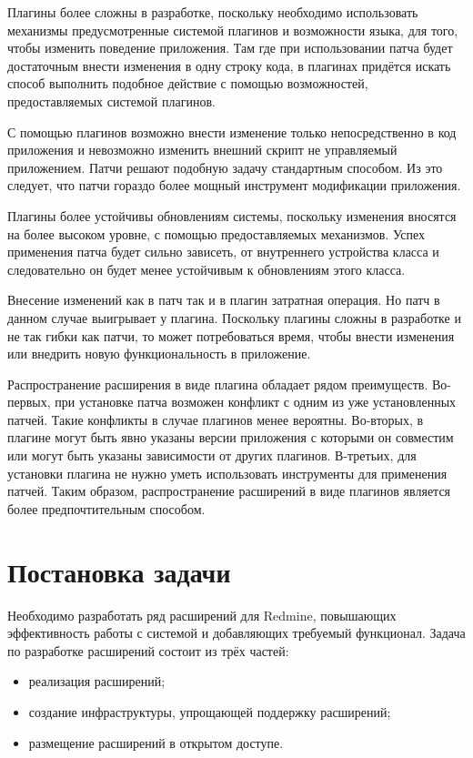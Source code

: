Плагины более сложны в разработке, поскольку необходимо использовать
механизмы предусмотренные системой плагинов и возможности языка, для того,
чтобы изменить поведение приложения. Там где при использовании патча будет
достаточным внести изменения в одну строку кода, в плагинах придётся искать
способ выполнить подобное действие с помощью возможностей, предоставляемых
системой плагинов.

С помощью плагинов возможно внести изменение только непосредственно в код
приложения и невозможно изменить внешний скрипт не управляемый приложением.
Патчи решают подобную задачу стандартным способом. Из это следует, что патчи
гораздо более мощный инструмент модификации приложения.

Плагины более устойчивы обновлениям системы, поскольку изменения вносятся на
более высоком уровне, с помощью предоставляемых механизмов. Успех применения
патча будет сильно зависеть, от внутреннего устройства класса и следовательно
он будет менее устойчивым к обновлениям этого класса.

Внесение изменений как в патч так и в плагин затратная операция. Но патч в
данном случае выигрывает у плагина. Поскольку плагины сложны в разработке и не
так гибки как патчи, то может потребоваться время, чтобы внести изменения или
внедрить новую функциональность в приложение.

Распространение расширения в виде плагина обладает рядом преимуществ.
Во-первых, при установке патча возможен конфликт с одним из уже установленных
патчей. Такие конфликты в случае плагинов менее вероятны. Во-вторых, в плагине
могут быть явно указаны версии приложения с которыми он совместим или могут
быть указаны зависимости от других плагинов. В-третьих, для установки плагина
не нужно уметь использовать инструменты для применения патчей. Таким образом,
распространение расширений в виде плагинов является более предпочтительным
способом.

\section{Постановка задачи}
Необходимо разработать ряд расширений для Redmine, повышающих
эффективность работы с системой и добавляющих требуемый функционал. Задача
по разработке расширений состоит из трёх частей:
\begin{itemize}
  \item реализация расширений;
  \item создание инфраструктуры, упрощающей поддержку расширений;
  \item размещение расширений в открытом доступе.
\end{itemize}

